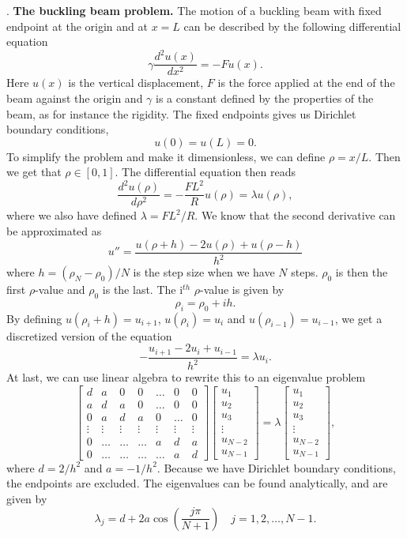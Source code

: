 \documentclass[a4paper,10pt]{article}
\newcommand{\dder}[2]{\frac{d^2 #1}{d #2 ^2}}
\begin{document}
. \textbf{The buckling beam problem.} 
The motion of a buckling beam with fixed endpoint at the origin and at $x=L$ can be described by the following differential equation
\begin{equation*}
    \gamma \dder{u(x)}{x} = - F u(x).
\end{equation*}
Here $u(x)$ is the vertical displacement, $F$ is the force applied at the end of the beam against the origin and $\gamma$ is a constant defined by the properties of the beam, as for instance the rigidity. The fixed endpoints gives us Dirichlet boundary conditions,
$$u(0) = u(L) = 0. $$
To simplify the problem and make it dimensionless, we can define $\rho = x/L$. Then we get that $\rho \in [0,1]$. The differential equation then reads 
\begin{equation*}
    \dder{u(\rho)}{\rho} = -\frac{FL^2}{R} u(\rho) = \lambda u(\rho),
\end{equation*}
where we also have defined $\lambda = FL^2/R$. We know that the second derivative can be approximated as 
$$u'' = \frac{u(\rho + h) - 2u(\rho) + u(\rho-h)}{h^2} $$
where $h = (\rho_N - \rho_0)/N$ is the step size when we have $N$ steps. $\rho_0$ is then the first $\rho$-value and $\rho_0$ is the last. The i$^{th}$ $\rho$-value is given by 
$$ \rho_i = \rho_0 + ih.  $$
By defining $u(\rho_i + h) = u_{i+1}$, $u(\rho_i) = u_i$ and $u(\rho_{i-1}) = u_{i-1}$, we get a discretized version of the equation 
\begin{equation*}
    - \frac{u_{i+1} - 2u_i + u_{i-1}}{h^2} = \lambda u_i.
\end{equation*}
At last, we can use linear algebra to rewrite this to an eigenvalue problem 
\begin{equation*}
\begin{bmatrix} d& a & 0   & 0    & \dots  &0     & 0 \\
                                a & d & a & 0    & \dots  &0     &0 \\
                                0   & a & d & a  &0       &\dots & 0\\
                                \vdots  & \vdots & \vdots & \vdots  &\vdots  &\vdots & \vdots\\
                                0   & \dots & \dots & \dots  &a  &d & a\\
                                0   & \dots & \dots & \dots  &\dots       &a & d\end{bmatrix} 
                                 \begin{bmatrix} u_1 \\ u_2 \\ u_3 \\ \vdots \\ u_{N-2} \\ u_{N-1}\end{bmatrix} = \lambda \begin{bmatrix} u_1 \\ u_2 \\ u_3 \\ \vdots \\ u_{N-2} \\ u_{N-1}\end{bmatrix},
\label{eq:matrixse} 
\end{equation*}
where $d = 2/h^2$ and $a = -1/h^2$. Because we have Dirichlet boundary conditions, the endpoints are excluded. The eigenvalues can be found analytically, and are given by 
$$\lambda_j = d + 2a \cos\left(\frac{j\pi}{N+1}\right) \quad j = 1,2, \dots, N-1. $$
\end{document}
